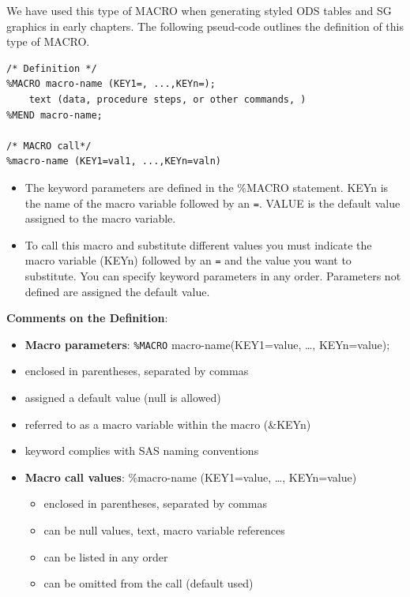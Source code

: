 \documentclass[
]{book}
\providecommand{\tightlist}{%
  \setlength{\itemsep}{0pt}\setlength{\parskip}{0pt}}
\begin{document}
We have used this type of MACRO when generating styled ODS tables and SG graphics in early chapters. The following pseud-code outlines the definition of this type of MACRO.

\begin{verbatim}
/* Definition */
%MACRO macro-name (KEY1=, ...,KEYn=);
    text (data, procedure steps, or other commands, )
%MEND macro-name;

/* MACRO call*/
%macro-name (KEY1=val1, ...,KEYn=valn)
\end{verbatim}

\begin{itemize}
\item
  The keyword parameters are defined in the \%MACRO statement. KEYn is the name of the macro variable followed by an \texttt{=}. VALUE is the default value assigned to the macro variable.
\item
  To call this macro and substitute different values you must indicate the macro variable (KEYn) followed by an \texttt{=} and the value you want to substitute. You can specify keyword parameters in any order. Parameters not defined are assigned the default value.
\end{itemize}

\textbf{Comments on the Definition}:

\begin{itemize}
\item
  \textbf{Macro parameters}: \texttt{\%MACRO} macro-name(KEY1=value, \ldots, KEYn=value);
\item
  enclosed in parentheses, separated by commas
\item
  assigned a default value (null is allowed)
\item
  referred to as a macro variable within the macro (\&KEYn)
\item
  keyword complies with SAS naming conventions
\item
  \textbf{Macro call values}: \%macro-name (KEY1=value, \ldots, KEYn=value)

  \begin{itemize}
  \tightlist
  \item
    enclosed in parentheses, separated by commas
  \item
    can be null values, text, macro variable references
  \item
    can be listed in any order
  \item
    can be omitted from the call (default used)
  \end{itemize}
\end{itemize}
\end{document}
